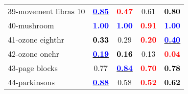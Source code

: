 \begin{table}
\begin{center}
\begin{tabular}{lc|c|c|c}
39-movement libras 10 & \underline{\textcolor{blue}{\textbf{  0.85}}} & \textcolor{red}{\textbf{  0.47}} &   0.61 & \textcolor{black}{\textbf{  0.80}} \\
40-mushroom & \textcolor{blue}{\textbf{  1.00}} & \textcolor{blue}{\textbf{  1.00}} & \textcolor{red}{\textbf{  0.91}} & \textcolor{blue}{\textbf{  1.00}} \\ \hline
41-ozone eighthr & \textcolor{black}{\textbf{  0.33}} &   0.29 & \textcolor{red}{\textbf{  0.20}} & \underline{\textcolor{blue}{\textbf{  0.40}}} \\
42-ozone onehr & \underline{\textcolor{blue}{\textbf{  0.19}}} & \textcolor{black}{\textbf{  0.16}} &   0.13 & \textcolor{red}{\textbf{  0.04}} \\
43-page blocks &   0.77 & \underline{\textcolor{blue}{\textbf{  0.84}}} & \textcolor{red}{\textbf{  0.70}} & \textcolor{black}{\textbf{  0.78}} \\
44-parkinsons & \underline{\textcolor{blue}{\textbf{  0.88}}} &   0.58 & \textcolor{red}{\textbf{  0.52}} & \textcolor{black}{\textbf{  0.62}} \\\end{tabular}
\label{tab:balaccClassif0}
\end{center}
\end{table}
